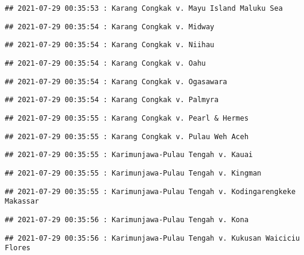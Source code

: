 \documentclass[
]{article}
\begin{document}
\begin{verbatim}
## 2021-07-29 00:35:53 : Karang Congkak v. Mayu Island Maluku Sea
\end{verbatim}

\begin{verbatim}
## 2021-07-29 00:35:54 : Karang Congkak v. Midway
\end{verbatim}

\begin{verbatim}
## 2021-07-29 00:35:54 : Karang Congkak v. Niihau
\end{verbatim}

\begin{verbatim}
## 2021-07-29 00:35:54 : Karang Congkak v. Oahu
\end{verbatim}

\begin{verbatim}
## 2021-07-29 00:35:54 : Karang Congkak v. Ogasawara
\end{verbatim}

\begin{verbatim}
## 2021-07-29 00:35:54 : Karang Congkak v. Palmyra
\end{verbatim}

\begin{verbatim}
## 2021-07-29 00:35:55 : Karang Congkak v. Pearl & Hermes
\end{verbatim}

\begin{verbatim}
## 2021-07-29 00:35:55 : Karang Congkak v. Pulau Weh Aceh
\end{verbatim}

\begin{verbatim}
## 2021-07-29 00:35:55 : Karimunjawa-Pulau Tengah v. Kauai
\end{verbatim}

\begin{verbatim}
## 2021-07-29 00:35:55 : Karimunjawa-Pulau Tengah v. Kingman
\end{verbatim}

\begin{verbatim}
## 2021-07-29 00:35:55 : Karimunjawa-Pulau Tengah v. Kodingarengkeke Makassar
\end{verbatim}

\begin{verbatim}
## 2021-07-29 00:35:56 : Karimunjawa-Pulau Tengah v. Kona
\end{verbatim}

\begin{verbatim}
## 2021-07-29 00:35:56 : Karimunjawa-Pulau Tengah v. Kukusan Waiciciu Flores
\end{verbatim}
\end{document}
